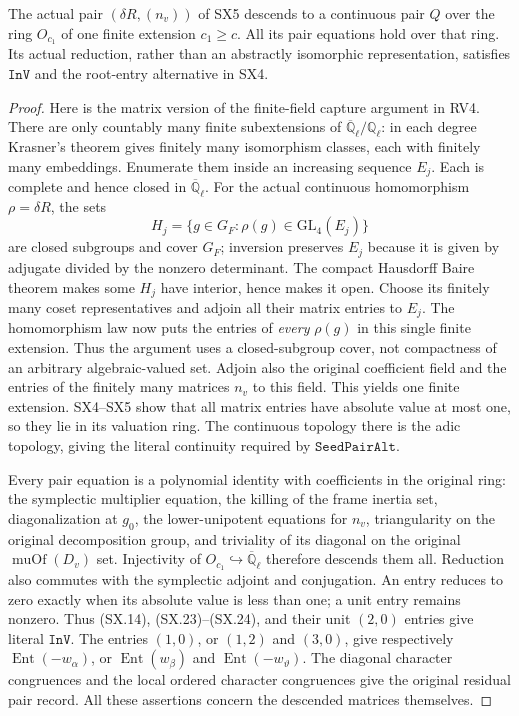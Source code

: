 \begin{proposition}
\label{claim:SX7}
The actual pair $(\delta R,(n_v))$ of SX5 descends to a
continuous pair $Q$ over the ring $O_{c_1}$ of one finite
extension $c_1\ge c$.  All its pair equations hold over that
ring.  Its actual reduction, rather than an abstractly
isomorphic representation, satisfies $\texttt{InV}$ and the
root-entry alternative in SX4.
\end{proposition}
\begin{proof}
Here is the matrix version of the finite-field capture argument
in RV4.  There are only countably many finite subextensions of
$\overline{\mathbb Q}_\ell/\mathbb Q_\ell$: in each degree
Krasner's theorem gives finitely many isomorphism classes, each
with finitely many embeddings.  Enumerate them inside an
increasing sequence $E_j$.  Each is complete and hence closed
in $\overline{\mathbb Q}_\ell$.
For the actual continuous homomorphism
$\rho=\delta R$, the sets
\[
           H_j=\{g\in G_F:\rho(g)\in\mathrm{GL}_4(E_j)\}
\]
are closed subgroups and cover $G_F$; inversion preserves $E_j$
because it is given by adjugate divided by the nonzero determinant.
The compact Hausdorff Baire theorem makes some $H_j$ have
interior, hence makes it open.  Choose its finitely many coset
representatives and adjoin all their matrix entries to $E_j$.
The homomorphism law now puts the entries of \emph{every}
$\rho(g)$ in this single finite extension.  Thus the argument
uses a closed-subgroup cover, not compactness of an arbitrary
algebraic-valued set.
Adjoin also the original coefficient field and the entries of the
finitely many matrices $n_v$ to this field.
This yields one finite extension.  SX4--SX5 show that all
matrix entries have absolute value at most one, so they lie
in its valuation ring.  The continuous topology there is
the adic topology, giving the literal continuity required
by $\texttt{SeedPairAlt}$.

Every pair equation is a polynomial identity with coefficients
in the original ring: the symplectic multiplier equation,
the killing of the frame inertia set, diagonalization at
$g_0$, the lower-unipotent equations for $n_v$, triangularity
on the original decomposition group, and triviality of its
diagonal on the original $\operatorname{muOf}(D_v)$ set.  Injectivity
of $O_{c_1}\hookrightarrow\overline{\mathbb Q}_\ell$
therefore descends them all.
Reduction also commutes with the symplectic adjoint and
conjugation.  An entry reduces to zero exactly when its
absolute value is less than one; a unit entry remains
nonzero.  Thus (SX.14), (SX.23)--(SX.24), and their unit
$(2,0)$ entries give literal $\texttt{InV}$.
The entries $(1,0)$, or $(1,2)$ and $(3,0)$, give respectively
$\operatorname{Ent}(-w_\alpha)$, or
$\operatorname{Ent}(w_\beta)$ and
$\operatorname{Ent}(-w_\vartheta)$.
The diagonal character congruences and the local ordered
character congruences give the original residual pair record.
All these assertions concern the descended matrices themselves.
\end{proof}

